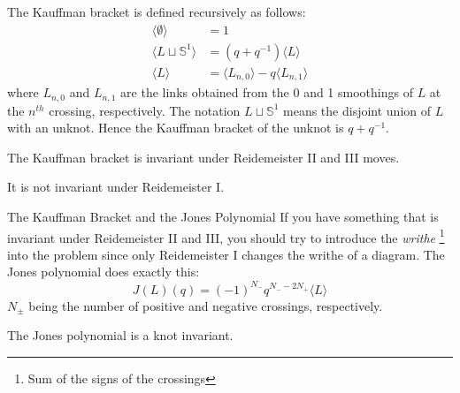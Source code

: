 \documentclass{beamer}
\begin{document}
    \begin{frame}
        The Kauffman bracket is defined recursively as follows:
        \begin{align}
            \langle\emptyset\rangle&=1\\
            \langle{L\sqcup\mathbb{S}^{1}}\rangle&=(q+q^{-1})\langle{L}\rangle\\
            \langle{L}\rangle&=
                \langle{L_{n,0}}\rangle-q\langle{L_{n,1}}\rangle
        \end{align}
        where $L_{n,0}$ and $L_{n,1}$ are the links obtained from the
        0 and 1 smoothings of $L$ at the $n^{th}$ crossing, respectively. The
        notation $L\sqcup\mathbb{S}^{1}$ means the disjoint union of
        $L$ with an unknot. Hence the Kauffman bracket of the
        unknot is $q+q^{-1}$.
        \begin{theorem}
            The Kauffman bracket is invariant under Reidemeister II and III
            moves.
        \end{theorem}
        It is not invariant under Reidemeister I.
    \end{frame}
    \begin{frame}{The Kauffman Bracket and the Jones Polynomial}
        If you have something that is invariant under Reidemeister II and III,
        you should try to introduce the \textit{writhe}%
        \footnote{Sum of the signs of the crossings}
        into the problem since only Reidemeister I changes the writhe of a
        diagram. The Jones polynomial does exactly this:
        \begin{equation}
            J(L)(q)=(-1)^{N_{-}}q^{N_{-}-2N_{+}}\langle{L}\rangle
        \end{equation}
        $N_{\pm}$ being the number of positive and negative crossings,
        respectively.
        \begin{theorem}
            The Jones polynomial is a knot invariant.
        \end{theorem}
    \end{frame}
\end{document}

